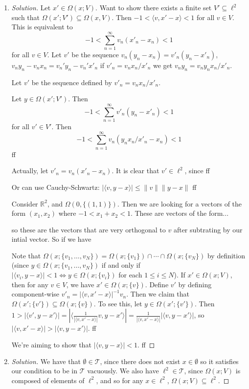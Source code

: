 \documentclass{article}
\newcommand{\R}{{\mathbb R}}
\begin{document}
\begin{enumerate}
	\item \begin{proof}[Solution]\let\qed\relax
		Let $x' \in \Omega(x;V)$.
		Want to show there exists a finite set $V' \subseteq \ell^2$
		such that $\Omega(x';V') \subseteq \Omega(x,V)$.
		Then $-1 < \langle v, x' - x \rangle < 1$ for all $v \in V$.
		This is equivalent to
		\[
			-1 < \sum_{n = 1}^\infty v_n(x'_n - x_n) < 1
		\]
		for all $v \in V$.
		Let $v'$ be the sequence $v_n(y_n - x_n) = v'_n(y_n - x'_n)$,
		$v_ny_n - v_nx_n = v_n'y_n - v_n'x'_n$
		if $v'_n = v_nx_n/x'_n$ we get $v_ny_n = v_ny_nx_n/x'_n$.

		Let $v'$ be the sequence defined by $v'_n = v_nx_n/x'_n$.

		Let $y \in \Omega(x';V')$.
		Then
		\[
			-1 < \sum_{n=1}^\infty v'_n(y_n - x'_n) < 1
		\]
		for all $v' \in V'$.
		Then
		\[
			-1 < \sum_{n=1}^\infty v_n(y_nx_n/x'_n - x_n) < 1
		\]
		ff

		Actually, let $v'_n = v_n(x'_n - x_n)$.
		It is clear that $v' \in \ell^2$,
		since ff

		Or can use Cauchy-Schwartz: $|\langle v, y-x \rangle|
		\leq \lVert v \rVert \lVert y-x \rVert$
		ff

		Consider $\R^2$, and $\Omega(0, \{(1,1)\})$.
		Then we are looking for a vectors of the form $(x_1,x_2)$
		where $-1 < x_1 + x_2 < 1$.
		These are vectors of the form...

		so these are the vectors that are very orthogonal to $v$
		after subtrating by our intial vector.
		So if we have 

		Note that $\Omega(x;\{v_1,\dots,v_N\}) =
		\Omega(x;\{v_1\}) \cap \cdots \cap \Omega(x;\{v_N\})$
		by definition (since $y \in \Omega(x;\{v_1,\dots,v_N\})$
		if and only if $|\langle v_i, y-x\rangle| < 1 \Leftrightarrow y \in \Omega(x;\{v_i\})$
		for each $1 \leq i \leq N$).
		If $x' \in \Omega(x;V)$, then for any $v \in V$,
		we have $x' \in \Omega(x;\{v\})$.
		Define $v'$ by defining component-wise $v'_n = |\langle v, x' - x\rangle|^{-1}v_n$.
		Then we claim that $\Omega(x';\{v'\}) \subseteq \Omega(x;\{v\})$.
		To see this, let $y \in \Omega(x';\{v'\})$.
		Then $1> |\langle v', y-x'\rangle| =
		|\langle \frac{1}{|\langle v, x' - x\rangle|}v, y-x'\rangle|
		= \frac{1}{|\langle v, x' - x\rangle|}|\langle v, y-x'\rangle|$,
		so $|\langle v,x'-x\rangle| > |\langle v, y-x' \rangle|$.
		ff

		We're aiming to show that $|\langle v, y-x \rangle|<1$.
		ff
	\end{proof}
	\item \begin{proof}[Solution]\let\qed\relax
		We have that $\emptyset \in \mathcal{T}$,
		since there does not exist $x \in \emptyset$ so it
		satisfies our condition to be in $\mathcal{T}$ vacuously.
		We also have $\ell^2 \in \mathcal{T}$,
		since $\Omega(x;V)$ is composed of elements of $\ell^2$,
		and so for any $x \in \ell^2$, $\Omega(x;V) \subseteq \ell^2$.
		

\end{proof}
\end{enumerate}
\end{document}
